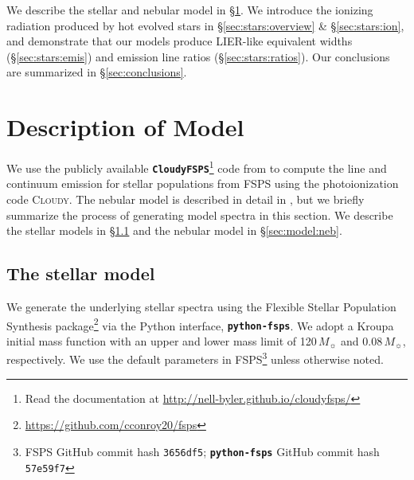 \documentclass[preprint2]{aastex62}
\newcommand{\FSPS}{{\sc FSPS}\xspace}
\newcommand{\pFSPS}{{\tt \textbf{python-fsps}}\xspace}
\newcommand{\CloudyFSPS}{{\tt \textbf{CloudyFSPS}}\xspace}
\newcommand{\Cloudy}{\textsc{Cloudy}\xspace}
\newcommand\Msun{\ensuremath{\,M_{\sun}}\xspace}
\begin{document}
We describe the stellar and nebular model in \S\ref{sec:model}. We introduce the ionizing radiation produced by hot evolved stars in \S\ref{sec:stars:overview} \& \S\ref{sec:stars:ion}, and demonstrate that our models produce LIER-like equivalent widths (\S\ref{sec:stars:emis}) and emission line ratios (\S\ref{sec:stars:ratios}). Our conclusions are summarized in \S\ref{sec:conclusions}.

\section{Description of Model}\label{sec:model}

We use the publicly available \CloudyFSPS\footnote{Read the documentation at \url{http://nell-byler.github.io/cloudyfsps/}} \citep{cloudyFSPSv1} code from \citet{Byler+2017} to compute the line and continuum emission for stellar populations from \FSPS using the photoionization code \Cloudy. The nebular model is described in detail in \citet{Byler+2017}, but we briefly summarize the process of generating model spectra in this section. We describe the stellar models in \S\ref{sec:model:stellar} and the nebular model in \S\ref{sec:model:neb}.

\subsection{The stellar model}\label{sec:model:stellar}

We generate the underlying stellar spectra using the Flexible Stellar Population Synthesis package\footnote{\url{https://github.com/cconroy20/fsps}} \citep[FSPS; ][]{Conroy+2009, Conroy+2010} via the Python interface, \pFSPS \citep{pythonFSPSdfm}. We adopt a Kroupa initial mass function \citep[IMF;][]{Kroupa+2001} with an upper and lower mass limit of 120\Msun and 0.08\Msun, respectively. We use the default parameters in \FSPS\footnote{\FSPS GitHub commit hash \texttt{3656df5}; \pFSPS GitHub commit hash \texttt{57e59f7}} unless otherwise noted.
\end{document}

